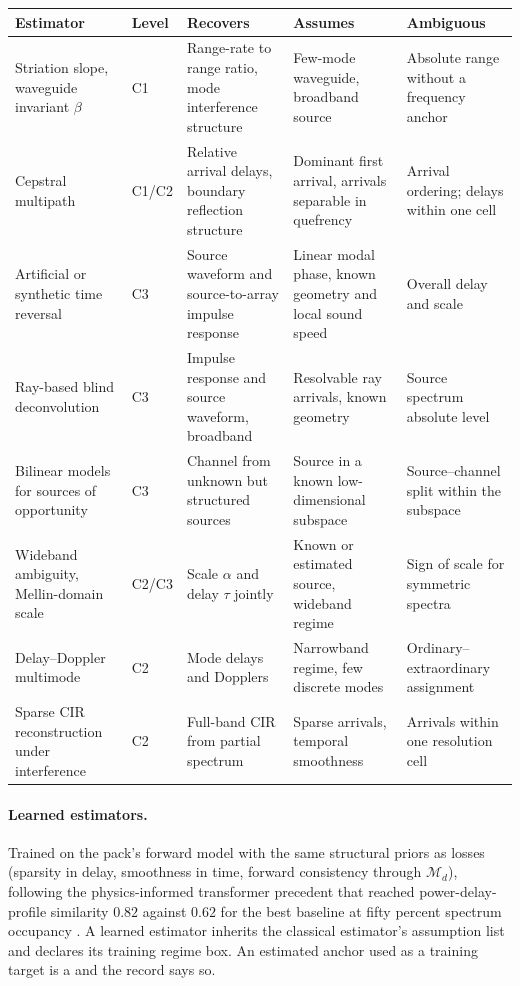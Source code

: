 \documentclass[11pt,a4paper]{article}
\begin{document}
\begin{center}\small
\begin{tabular}{@{}p{3.4cm}lp{3.4cm}p{3.6cm}p{2.6cm}@{}}
\toprule
Estimator & Level & Recovers & Assumes & Ambiguous \\
\midrule
Striation slope, waveguide invariant $\beta$ & C1 & Range-rate to range ratio, mode interference structure & Few-mode waveguide, broadband source & Absolute range without a frequency anchor \\
Cepstral multipath & C1/C2 & Relative arrival delays, boundary reflection structure & Dominant first arrival, arrivals separable in quefrency & Arrival ordering; delays within one cell \\
Artificial or synthetic time reversal & C3 & Source waveform and source-to-array impulse response & Linear modal phase, known geometry and local sound speed & Overall delay and scale \\
Ray-based blind deconvolution & C3 & Impulse response and source waveform, broadband & Resolvable ray arrivals, known geometry & Source spectrum absolute level \\
Bilinear models for sources of opportunity & C3 & Channel from unknown but structured sources & Source in a known low-dimensional subspace & Source--channel split within the subspace \\
Wideband ambiguity, Mellin-domain scale & C2/C3 & Scale $\alpha$ and delay $\tau$ jointly & Known or estimated source, wideband regime & Sign of scale for symmetric spectra \\
Delay--Doppler multimode & C2 & Mode delays and Dopplers & Narrowband regime, few discrete modes & Ordinary--extraordinary assignment \\
Sparse CIR reconstruction under interference & C2 & Full-band CIR from partial spectrum & Sparse arrivals, temporal smoothness & Arrivals within one resolution cell \\
\bottomrule
\end{tabular}
\end{center}

\paragraph{Learned estimators.} Trained on the pack's forward model with the same structural priors as losses (sparsity in delay, smoothness in time, forward consistency through $\mathcal M_d$), following the physics-informed transformer precedent that reached power-delay-profile similarity $0.82$ against $0.62$ for the best baseline at fifty percent spectrum occupancy \citep{zubow2026}. A learned estimator inherits the classical estimator's assumption list and declares its training regime box. An estimated anchor used as a training target is a  and the record says so.
\end{document}
